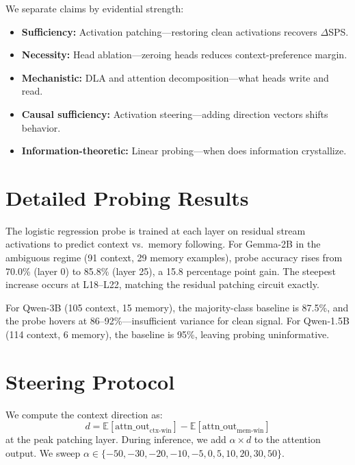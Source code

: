 \documentclass{article}
\begin{document}
We separate claims by evidential strength:
\begin{itemize}
    \item \textbf{Sufficiency:} Activation patching---restoring clean activations recovers $\Delta$SPS.
    \item \textbf{Necessity:} Head ablation---zeroing heads reduces context-preference margin.
    \item \textbf{Mechanistic:} DLA and attention decomposition---what heads write and read.
    \item \textbf{Causal sufficiency:} Activation steering---adding direction vectors shifts behavior.
    \item \textbf{Information-theoretic:} Linear probing---when does information crystallize.
\end{itemize}

\section{Detailed Probing Results}
\label{app:probing}

The logistic regression probe is trained at each layer on residual stream activations to predict context vs.\ memory following. For Gemma-2B in the ambiguous regime (91 context, 29 memory examples), probe accuracy rises from 70.0\% (layer 0) to 85.8\% (layer 25), a 15.8 percentage point gain. The steepest increase occurs at L18--L22, matching the residual patching circuit exactly.

For Qwen-3B (105 context, 15 memory), the majority-class baseline is 87.5\%, and the probe hovers at 86--92\%---insufficient variance for clean signal. For Qwen-1.5B (114 context, 6 memory), the baseline is 95\%, leaving probing uninformative.

\section{Steering Protocol}
\label{app:steering}

We compute the context direction as:
\begin{equation}
d = \mathbb{E}[\text{attn\_out}_{\text{ctx-win}}] - \mathbb{E}[\text{attn\_out}_{\text{mem-win}}]
\end{equation}
at the peak patching layer. During inference, we add $\alpha \times d$ to the attention output. We sweep $\alpha \in \{-50, -30, -20, -10, -5, 0, 5, 10, 20, 30, 50\}$.
\end{document}
